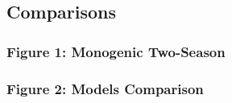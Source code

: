 \documentclass[
  letterpaper,
  DIV=11,
  numbers=noendperiod]{scrartcl}
\begin{document}
\hypertarget{comparisons}{%
\subsection{Comparisons}\label{comparisons}}

\hypertarget{figure-1-monogenic-two-season}{%
\subsubsection{Figure 1: Monogenic
Two-Season}\label{figure-1-monogenic-two-season}}

\hypertarget{figure-2-models-comparison}{%
\subsubsection{Figure 2: Models
Comparison}\label{figure-2-models-comparison}}
\end{document}
